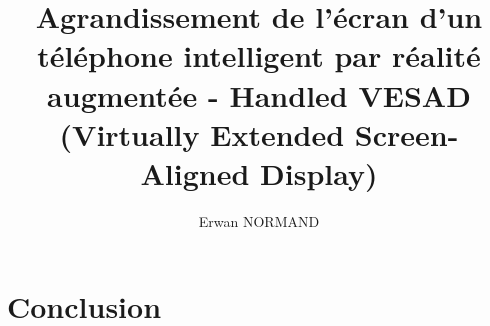 \documentclass[letterpaper, twoside, 12pt,%
  memoire, francais, creativecommons, hyperref, withAlgo2e%
]{thETS}
\title{Agrandissement de l'écran d'un téléphone intelligent par réalité augmentée - Handled VESAD (Virtually Extended Screen-Aligned Display)}
\author{Erwan NORMAND}
\begin{document}

\maketitle
\presentjury

\begin{avantpropos}
  
\end{avantpropos}

\begin{remerciements}
  
\end{remerciements}



\tableofcontents
\listoftables
\listoffigures

\begin{listofabbr}[3cm]
  
\end{listofabbr}

\cleardoublepage
{}
\reversemarginpar

\begin{introduction}
  
\end{introduction}







\chapter*{Conclusion}
\label{ch:conclusion}


\appendix
\multiannexe



\newpage
\begin{spacing}{1}
  \nocite{*}
  
  
\end{spacing}
\end{document}
